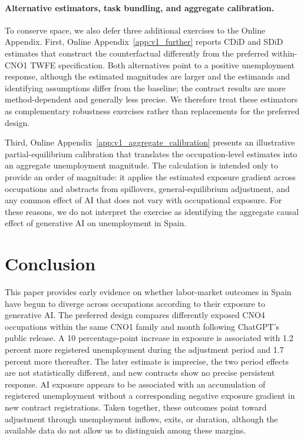 

\FloatBarrier


\paragraph{Alternative estimators, task bundling, and aggregate calibration.} To conserve space, we also defer three additional exercises to the Online Appendix. First, Online Appendix~\ref{app:v1_further} reports CDiD and SDiD estimates that construct the counterfactual differently from the preferred within-CNO1 TWFE specification. Both alternatives point to a positive unemployment response, although the estimated magnitudes are larger and the estimands and identifying assumptions differ from the baseline; the contract results are more method-dependent and generally less precise. We therefore treat these estimators as complementary robustness exercises rather than replacements for the preferred design.



Third, Online Appendix~\ref{app:v1_aggregate_calibration} presents an illustrative partial-equilibrium calibration that translates the occupation-level estimates into an aggregate unemployment magnitude. The calculation is intended only to provide an order of magnitude: it applies the estimated exposure gradient across occupations and abstracts from spillovers, general-equilibrium adjustment, and any common effect of AI that does not vary with occupational exposure. For these reasons, we do not interpret the exercise as identifying the aggregate causal effect of generative AI on unemployment in Spain.

\section{Conclusion}
\label{sec:conclusion}

This paper provides early evidence on whether labor-market outcomes in Spain have begun to diverge across occupations according to their exposure to generative AI. The preferred design compares differently exposed CNO4 occupations within the same CNO1 family and month following ChatGPT's public release. A 10 percentage-point increase in exposure is associated with 1.2 percent more registered unemployment during the adjustment period and 1.7 percent more thereafter. The later estimate is imprecise, the two period effects are not statistically different, and new contracts show no precise persistent response. AI exposure appears to be associated with an accumulation of registered unemployment without a corresponding negative exposure gradient in new contract registrations. Taken together, these outcomes point toward adjustment through unemployment inflows, exits, or duration, although the available data do not allow us to distinguish among these margins.

